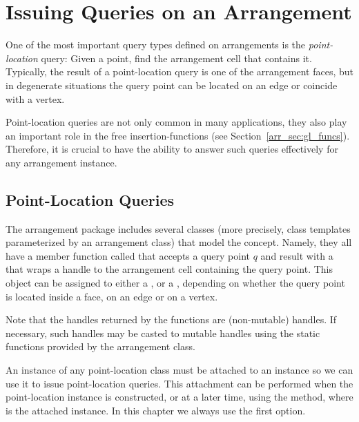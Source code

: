 \section{Issuing Queries on an Arrangement\label{arr_sec:queries}}

One of the most important query types defined on arrangements is
the {\em point-location} query: Given a point, find the
arrangement cell that contains it. Typically, the result of a
point-location query is one of the arrangement faces, but in
degenerate situations the query point can be located on an edge or
coincide with a vertex.

Point-location queries are not only common in many applications,
they also play an important role in the free insertion-functions
(see Section~\ref{arr_sec:gl_funcs}). Therefore, it is crucial to
have the ability to answer such queries effectively for any
arrangement instance.

\subsection{Point-Location Queries\label{arr_ssec:pl}}

The arrangement package includes several classes (more precisely,
class templates parameterized by an arrangement class) that model
the  concept. Namely, they all
have a member function called  that accepts a query
point $q$ and result with a \cgal\  that wraps a handle
to the arrangement cell containing the query point. This object can
be assigned to either a ,
 or a , depending
on whether the query point is located inside a face, on an edge or
on a vertex.

Note that the handles returned by the  functions are
 (non-mutable) handles. If necessary, such handles may
be casted to mutable handles using the static functions
 provided by the
arrangement class.

An instance of any point-location class must be attached to an
 instance so we can use it to issue point-location
queries. This attachment can be performed when the point-location
instance is constructed, or at a later time, using the 
method, where  is the attached  instance.
In this chapter we always use the first option.

